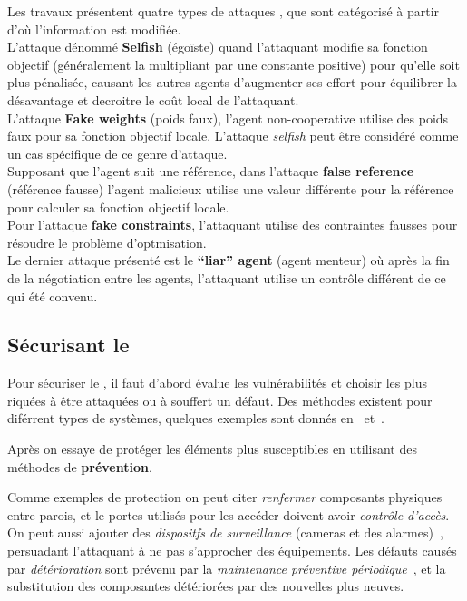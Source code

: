 \documentclass[../main.tex]{subfiles}
\begin{document}
Les travaux présentent quatre types de attaques \fdi{}, que sont catégorisé à partir d'où l'information est modifiée.
\\L'attaque dénommé \textbf{Selfish} (égoïste) quand l'attaquant modifie sa fonction objectif (généralement la multipliant par une constante positive) pour qu'elle soit plus pénalisée, causant les autres agents d'augmenter ses effort pour équilibrer la désavantage et decroitre le coût local de l'attaquant.
\\L'attaque \textbf{Fake weights} (poids faux), l'agent non-cooperative utilise des poids faux pour sa fonction objectif locale.
L'attaque \emph{selfish} peut être considéré comme un cas spécifique de ce genre d'attaque.
\\Supposant que l'agent suit une référence, dans l'attaque \textbf{false reference} (référence fausse) l'agent malicieux utilise une valeur différente pour la référence pour calculer sa fonction objectif locale.
\\Pour l'attaque \textbf{fake constraints}, l'attaquant utilise des contraintes fausses pour résoudre le problème d'optmisation.
\\Le dernier attaque présenté est le \textbf{``liar'' agent} (agent menteur) où après la fin de la négotiation entre les agents, l'attaquant utilise un contrôle différent de ce qui été convenu.

\subsection{Sécurisant le \cps{}}\label{sec:maintaining_security_fr}
Pour sécuriser le \cps{}, il faut d'abord évalue les vulnérabilités et choisir les plus riquées à être attaquées ou à souffert un défaut.
Des méthodes existent pour diférrent types de systèmes, quelques exemples sont donnés en~\cite{Bishop2005} et~\cite{WangLu2013}.

Après on essaye de protéger les éléments plus susceptibles en utilisant des méthodes de \textbf{prévention}.

Comme exemples de protection on peut citer \emph{renfermer} composants physiques entre parois, et le portes utilisés pour les accéder doivent avoir \emph{contrôle d'accès}.
On peut aussi ajouter des \emph{dispositfs de surveillance} (cameras et des alarmes)~\cite{CardenasEtAl2008,DingEtAl2018}, persuadant l'attaquant à ne pas s'approcher des équipements.
Les défauts causés par \emph{détérioration} sont prévenu par la \emph{maintenance préventive périodique}~\cite{ChenEtAl2021}, et la substitution des composantes détériorées par des nouvelles plus neuves.
\end{document}
